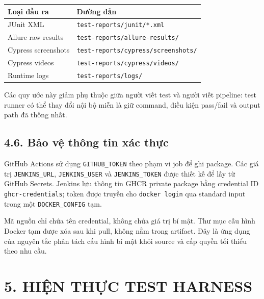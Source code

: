 \documentclass[
  vietnamese,
  12pt,
  a4paper,
  oneside]{report}
\begin{document}
\begin{longtable}[]{@{}
  >{\raggedright\arraybackslash}p{}
  >{\raggedright\arraybackslash}p{}@{}}
\toprule\noalign{}
\begin{minipage}[b]{\linewidth}\raggedright
Loại đầu ra
\end{minipage} & \begin{minipage}[b]{\linewidth}\raggedright
Đường dẫn
\end{minipage} \\
\midrule\noalign{}
\endhead
\bottomrule\noalign{}
\endlastfoot
JUnit XML & \texttt{test-reports/junit/*.xml} \\
Allure raw results & \texttt{test-reports/allure-results/} \\
Cypress screenshots & \nolinkurl{test-reports/cypress/screenshots/} \\
Cypress videos & \texttt{test-reports/cypress/videos/} \\
Runtime logs & \texttt{test-reports/logs/} \\
\end{longtable}

Các quy ước này giảm phụ thuộc giữa người viết test và người viết
pipeline: test runner có thể thay đổi nội bộ miễn là giữ command, điều
kiện pass/fail và output path đã thống nhất.

\section{4.6. Bảo vệ thông tin xác
thực}\label{46-bux1ea3o-vux1ec7-thuxf4ng-tin-xuxe1c-thux1ef1c}

GitHub Actions sử dụng \texttt{GITHUB\_TOKEN} theo phạm vi job để ghi
package. Các giá trị \texttt{JENKINS\_URL}, \texttt{JENKINS\_USER} và
\texttt{JENKINS\_TOKEN} được thiết kế để lấy từ GitHub Secrets. Jenkins
lưu thông tin GHCR private package bằng credential ID
\texttt{ghcr-credentials}; token được truyền cho \texttt{docker\ login}
qua standard input trong một \texttt{DOCKER\_CONFIG} tạm.

Mã nguồn chỉ chứa tên credential, không chứa giá trị bí mật. Thư mục cấu
hình Docker tạm được xóa sau khi pull, không nằm trong artifact. Đây là
ứng dụng của nguyên tắc phân tách cấu hình bí mật khỏi source và cấp
quyền tối thiểu theo nhu cầu.

\chapter{5. HIỆN THỰC TEST
HARNESS}\label{5-hiux1ec7n-thux1ef1c-test-harness}
\end{document}
